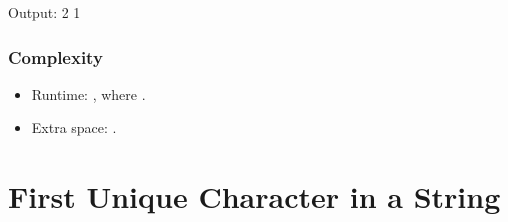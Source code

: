 \documentclass[letterpaper,12pt,english]{book}
\begin{document}
\begin{sphinxVerbatim}[commandchars=\\\{\}]
\end{sphinxVerbatim}

\begin{sphinxVerbatim}[commandchars=\\\{\}]
Output:
2
1
\end{sphinxVerbatim}


\subsubsection{Complexity}
\label{\detokenize{Counting/1679_Max_Number_of_K-Sum_Pairs:complexity}}\begin{itemize}
\item {} 
\sphinxAtStartPar
Runtime: , where .

\item {} 
\sphinxAtStartPar
Extra space: .

\end{itemize}

\sphinxstepscope


\section{First Unique Character in a String}
\label{\detokenize{Counting/387_First_Unique_Character_in_a_String:first-unique-character-in-a-string}}\label{\detokenize{Counting/387_First_Unique_Character_in_a_String::doc}}
\end{document}
